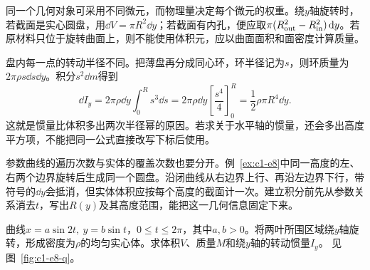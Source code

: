 同一个几何对象可采用不同微元，而物理量决定每个微元的权重。绕$y$轴旋转时，若截面是实心圆盘，用$\dd V=\pi R^2\dd y$；若截面有内孔，便应取$\pi(R_{\rm out}^2-R_{\rm in}^2)\mathop{}\!\mathrm d y$。若原材料只位于旋转曲面上，则不能使用体积元，应以曲面面积和面密度计算质量。

盘内每一点的转动半径不同。把薄盘再分成同心环，环半径记为$s$，则环质量为$2\pi\rho s\dd s\dd y$。积分$s^2\dd m$得到
\[\dd I_y=2\pi\rho\dd y\int_0^Rs^3\dd s
=2\pi\rho\dd y\left[\frac{s^4}{4}\right]_0^R
=\frac12\rho\pi R^4\dd y.\]
这就是惯量比体积多出两次半径幂的原因。若求关于水平轴的惯量，还会多出高度平方项，不能把同一公式直接改写下标后使用。

参数曲线的遍历次数与实体的覆盖次数也要分开。例~\ref{ex:c1-e8}中同一高度的左、右两个边界旋转后生成同一个圆盘。沿闭曲线从右边界上行、再沿左边界下行，带符号的$\dd y$会抵消，但实体体积应按每个高度的截面计一次。建立积分前先从参数关系消去$t$，写出$R(y)$及其高度范围，能把这一几何信息固定下来。

\begin{example}[参数曲线旋转体的体积与惯量]\label{ex:c1-e8}
曲线$x=a\sin2t,\ y=b\sin t$，$0\le t\le2\pi$，其中$a,b>0$。将两叶所围区域绕$y$轴旋转，形成密度为$\rho$的均匀实心体。求体积$V$、质量$M$和绕$y$轴的转动惯量$I_y$。 见图~\ref{fig:c1-e8-q}。
\end{example}

